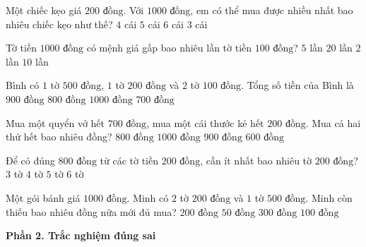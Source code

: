 \begin{ex} %
Một chiếc kẹo giá $200\text{ đồng}$. Với $1 000\text{ đồng}$, em có thể mua được nhiều nhất bao nhiêu chiếc kẹo như thế?
\choice
{$4$ cái}
{\True $5$ cái}
{$6$ cái}
{$3$ cái}
\end{ex}

\begin{ex} %
Tờ tiền $1 000\text{ đồng}$ có mệnh giá gấp bao nhiêu lần tờ tiền $100\text{ đồng}$?
\choice
{$5$ lần}
{$20$ lần}
{$2$ lần}
{\True $10$ lần}
\end{ex}

\begin{ex} %
Bình có $1$ tờ $500\text{ đồng}$, $1$ tờ $200\text{ đồng}$ và $2$ tờ $100\text{ đồng}$. Tổng số tiền của Bình là
\choice
{\True $900\text{ đồng}$}
{$800\text{ đồng}$}
{$1 000\text{ đồng}$}
{$700\text{ đồng}$}
\end{ex}

\begin{ex} %
Mua một quyển vở hết $700\text{ đồng}$, mua một cái thước kẻ hết $200\text{ đồng}$. Mua cả hai thứ hết bao nhiêu đồng?
\choice
{$800\text{ đồng}$}
{$1 000\text{ đồng}$}
{\True $900\text{ đồng}$}
{$600\text{ đồng}$}
\end{ex}

\begin{ex} %
Để có đúng $800\text{ đồng}$ từ các tờ tiền $200\text{ đồng}$, cần ít nhất bao nhiêu tờ $200\text{ đồng}$?
\choice
{$3$ tờ}
{\True $4$ tờ}
{$5$ tờ}
{$6$ tờ}
\end{ex}

\begin{ex} %
Một gói bánh giá $1 000\text{ đồng}$. Minh có $2$ tờ $200\text{ đồng}$ và $1$ tờ $500\text{ đồng}$. Minh còn thiếu bao nhiêu đồng nữa mới đủ mua?
\choice
{$200\text{ đồng}$}
{$50\text{ đồng}$}
{$300\text{ đồng}$}
{\True $100\text{ đồng}$}
\end{ex}

\textbf{Phần 2. Trắc nghiệm đúng sai}

